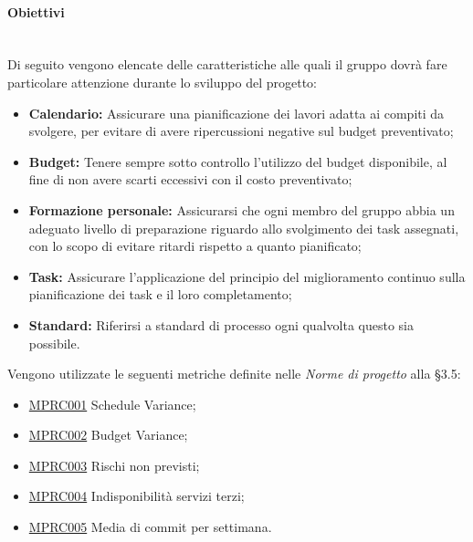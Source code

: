 \paragraph{Obiettivi}\mbox{}\\[0.4cm]
Di seguito vengono elencate delle caratteristiche alle quali il gruppo dovrà fare particolare attenzione durante lo sviluppo del progetto:
\begin{itemize}
	\item \textbf{Calendario:} Assicurare una pianificazione dei lavori adatta ai compiti da svolgere, per evitare di avere ripercussioni negative sul budget preventivato;
	\item \textbf{Budget:} Tenere sempre sotto controllo l'utilizzo del budget disponibile, al fine di non avere scarti eccessivi con il costo preventivato;
	\item \textbf{Formazione personale:} Assicurarsi che ogni membro del gruppo abbia un adeguato livello di preparazione riguardo allo svolgimento dei task assegnati, con lo scopo di evitare ritardi rispetto a quanto pianificato;
	\item \textbf{Task:} Assicurare l'applicazione del principio del miglioramento continuo sulla pianificazione dei task e il loro completamento;
	\item \textbf{Standard:} Riferirsi a standard di processo ogni qualvolta questo sia possibile.
\end{itemize}
Vengono utilizzate le seguenti metriche definite nelle \textit{Norme di progetto} alla §3.5:
\begin{itemize}
	\item \label{metrica_processo_MPRC001}\hyperref[sec:qprocesso_tabella_metriche_obiettivi]{MPRC001} Schedule Variance;
	\item \label{metrica_processo_MPRC002}\hyperref[sec:qprocesso_tabella_metriche_obiettivi]{MPRC002} Budget Variance;
	\item \label{metrica_processo_MPRC003}\hyperref[sec:qprocesso_tabella_metriche_obiettivi]{MPRC003} Rischi non previsti;
	\item \label{metrica_processo_MPRC004}\hyperref[sec:qprocesso_tabella_metriche_obiettivi]{MPRC004} Indisponibilità servizi terzi;
	\item \label{metrica_processo_MPRC005}\hyperref[sec:qprocesso_tabella_metriche_obiettivi]{MPRC005} Media di commit per settimana.
\end{itemize}
